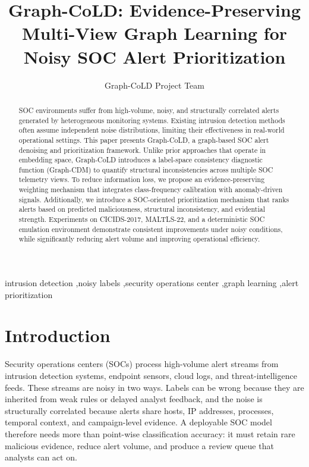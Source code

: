 \documentclass[preprint,12pt]{elsarticle}
\begin{document}
\begin{frontmatter}

\title{Graph-CoLD: Evidence-Preserving Multi-View Graph Learning for Noisy SOC Alert Prioritization}

\author[inst1]{Graph-CoLD Project Team}

\begin{abstract}
SOC environments suffer from high-volume, noisy, and structurally correlated alerts generated by heterogeneous monitoring systems. Existing intrusion detection methods often assume independent noise distributions, limiting their effectiveness in real-world operational settings.
This paper presents Graph-CoLD, a graph-based SOC alert denoising and prioritization framework. Unlike prior approaches that operate in embedding space, Graph-CoLD introduces a label-space consistency diagnostic function (Graph-CDM) to quantify structural inconsistencies across multiple SOC telemetry views.
To reduce information loss, we propose an evidence-preserving weighting mechanism that integrates class-frequency calibration with anomaly-driven signals. Additionally, we introduce a SOC-oriented prioritization mechanism that ranks alerts based on predicted maliciousness, structural inconsistency, and evidential strength.
Experiments on CICIDS-2017, MALTLS-22, and a deterministic SOC emulation environment demonstrate consistent improvements under noisy conditions, while significantly reducing alert volume and improving operational efficiency.
\end{abstract}

\begin{keyword}
intrusion detection \sep noisy labels \sep security operations center \sep graph learning \sep alert prioritization
\end{keyword}

\end{frontmatter}

\section{Introduction}
Security operations centers (SOCs) process high-volume alert streams from intrusion detection systems, endpoint sensors, cloud logs, and threat-intelligence feeds. These streams are noisy in two ways. Labels can be wrong because they are inherited from weak rules or delayed analyst feedback, and the noise is structurally correlated because alerts share hosts, IP addresses, processes, temporal context, and campaign-level evidence. A deployable SOC model therefore needs more than point-wise classification accuracy: it must retain rare malicious evidence, reduce alert volume, and produce a review queue that analysts can act on.
\end{document}
